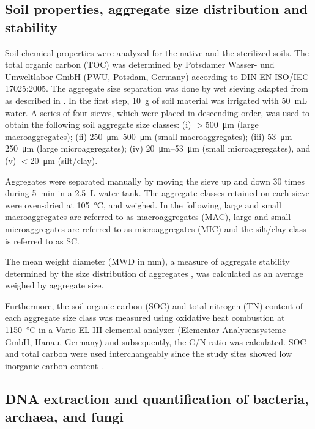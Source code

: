\subsection{Soil properties, aggregate size distribution and stability}

Soil-chemical properties were analyzed for the native and the sterilized soils. The total organic carbon (TOC) was determined by Potsdamer Wasser- und Umweltlabor GmbH (PWU, Potsdam, Germany) according to DIN EN ISO/IEC 17025:2005. The aggregate size separation was done by wet sieving adapted from \citet{Elliott1986} as described in \citet{RiverasMunoz2022}. In the first step, \SI{10}{\gram} of soil material was irrigated with \SI{50}{\milli\liter} water. A series of four sieves, which were placed in descending order, was used to obtain the following soil aggregate size classes: (i) $>$\SI{500}{\micro\meter} (large macroaggregates); (ii) \SIrange{250}{500}{\micro\meter} (small macroaggregates); (iii) \SIrange{53}{250}{\micro\meter} (large microaggregates); (iv) \SIrange{20}{53}{\micro\meter} (small microaggregates), and (v) $<$\SI{20}{\micro\meter} (silt/clay).

Aggregates were separated manually by moving the sieve up and down 30 times during \SI{5}{\minute} in a \SI{2.5}{\liter} water tank. The aggregate classes retained on each sieve were oven-dried at \SI{105}{\degreeCelsius}, and weighed. In the following, large and small macroaggregates are referred to as macroaggregates (MAC), large and small microaggregates are referred to as microaggregates (MIC) and the silt/clay class is referred to as SC.

The mean weight diameter (MWD in \si{\milli\metre}), a measure of aggregate stability determined by the size distribution of aggregates \citep{Amezketa1999}, was calculated as an average weighed by aggregate size.

Furthermore, the soil organic carbon (SOC) and total nitrogen (TN) content of each aggregate size class was measured using oxidative heat combustion at \SI{1150}{\degreeCelsius} in a Vario EL III elemental analyzer (Elementar Analysensysteme GmbH, Hanau, Germany) and subsequently, the C/N ratio was calculated. SOC and total carbon were used interchangeably since the study sites showed low inorganic carbon content \citep{RiverasMunoz2022}.

\subsection{DNA extraction and quantification of bacteria, archaea, and fungi}

